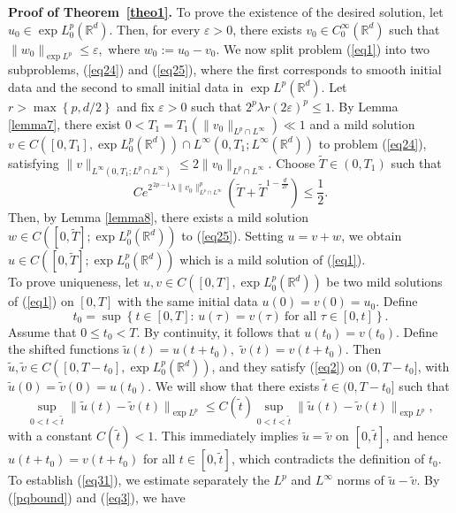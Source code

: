\documentclass[a4paper,11pt]{amsart}
\renewcommand\eqref[1]{(\ref{#1})} %
\numberwithin{equation}{section}
\theoremstyle{plain}
\theoremstyle{definition}
\begin{document}
{\bf Proof of Theorem~\ref{theo1}.} To prove the existence of the desired solution, let $u_0 \in \exp L^p_0(\mathbb{R}^d)$. Then, for every $\varepsilon > 0$, there exists $v_0 \in C^\infty_0(\mathbb{R}^d)$ such that
$\|w_0\|_{\exp L^p}\leq\varepsilon,$ where $w_0:=u_0-v_0$. We now split problem (\ref{eq1}) into two subproblems, \eqref{eq24} and \eqref{eq25}, where the first corresponds to smooth initial data and the second to small initial data in $\exp L^p(\mathbb{R}^d)$. Let $r>\max\left\{p,d/2\right\}$ and fix $\varepsilon>0$ such that $2^p\lambda r (2\varepsilon)^p\leq1$. By Lemma \ref{lemma7}, there exist $0<T_1=T_1(\|v_0\|_{L^p\cap L^\infty})\ll1$
and a mild solution $v\in C([0,T_1],\exp L^p_0(\mathbb{R}^d))
\cap L^\infty(0,T_1;L^\infty(\mathbb{R}^d))$ to problem \eqref{eq24}, satisfying $\|v\|_{L^\infty(0,T_1;L^p\cap L^\infty)}
\le 2\|v_0\|_{L^p\cap L^\infty}.$ Choose $\widetilde{T}\in(0,T_1)$ such that
\[
C e^{2^{\,2p-1}\lambda\|v_0\|_{L^p\cap L^\infty}^p}
\left(\widetilde{T}
+\widetilde{T}^{1-\frac{d}{2r}}\right)
\le \frac12.
\]
Then, by Lemma \ref{lemma8}, there exists a mild solution $w\in C([0,\widetilde{T}];\exp L^p_0(\mathbb{R}^d))$ to  \eqref{eq25}.
Setting $u=v+w$, we obtain $ u\in C([0,\widetilde{T}];\exp L^p_0(\mathbb{R}^d))$ which is a mild solution of \eqref{eq1}.\\
To prove uniqueness, let $u,v \in C([0,T],\exp L^p_0(\mathbb{R}^d))$ 
be two mild solutions of \eqref{eq1} on $[0,T]$ with the same initial data 
$u(0)=v(0)=u_0$. Define
\[
t_0=\sup\left\{t\in[0,T]:\, u(\tau)=v(\tau)\ \text{for all } \tau\in[0,t]\right\}.
\]
Assume that $0\le t_0<T$. By continuity, it follows that 
$u(t_0)=v(t_0)$. Define the shifted functions
$
\tilde{u}(t)=u(t+t_0), \,\,
\tilde{v}(t)=v(t+t_0).
$
Then $\tilde{u},\tilde{v}\in C([0,T-t_0],\exp L^p_0(\mathbb{R}^d))$, 
and they satisfy \eqref{eq2} on $(0,T-t_0]$, with $\tilde{u}(0)=\tilde{v}(0)=u(t_0).$
We will show that there exists $\tilde{t}\in(0,T-t_0]$ such that
\begin{equation}\label{eq31}
\sup_{0<t<\tilde{t}}
\|\tilde{u}(t)-\tilde{v}(t)\|_{\exp L^p}
\le C(\tilde{t})
\sup_{0<t<\tilde{t}}
\|\tilde{u}(t)-\tilde{v}(t)\|_{\exp L^p},
\end{equation}
with a constant $C(\tilde{t})<1$. This immediately implies 
$\tilde{u}=\tilde{v}$ on $[0,\tilde{t}]$, and hence 
$u(t+t_0)=v(t+t_0)$ for all $t\in[0,\tilde{t}]$, 
which contradicts the definition of $t_0$.\\
To establish \eqref{eq31}, we estimate separately the $L^p$ and $L^\infty$ norms 
of $\tilde{u}-\tilde{v}$. By \eqref{pqbound} and \eqref{eq3}, we have
\end{document}
